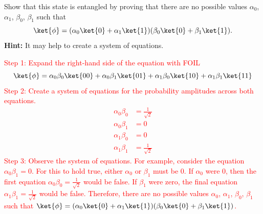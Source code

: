 \documentclass[12pt]{article}
\begin{document}
Show that this state is entangled by proving that there are no possible values $\alpha_0$, $\alpha_1$, $\beta_0$, $\beta_1$ such that
\[
\ket{\phi} = (\alpha_0 \ket{0} + \alpha_1 \ket{1})(\beta_0 \ket{0} + \beta_1 \ket{1}).
\]
\textbf{Hint:} It may help to create a system of equations.

\textcolor{red}{
Step 1: Expand the right-hand side of the equation with FOIL
\[
\ket{\phi} = \alpha_0\beta_0\ket{00} + \alpha_0\beta_1\ket{01} + \alpha_1\beta_0\ket{10} + \alpha_1\beta_1\ket{11}
\]
Step 2: Create a system of equations for the probability amplitudes across both equations.
\begin{align*}
    \alpha_0\beta_0 &= \frac{1}{\sqrt{2}} \\
    \alpha_0\beta_1 &= 0 \\
    \alpha_1\beta_0 &= 0 \\
    \alpha_1\beta_1 &= \frac{1}{\sqrt{2}}
\end{align*}
Step 3: Observe the system of equations. For example, consider the equation $\alpha_0\beta_1 = 0$. For this to hold true, either $\alpha_0$ or $\beta_1$ must be 0. If $\alpha_0$ were 0, then the first equation $\alpha_0\beta_0 = \frac{1}{\sqrt{2}}$ would be false. If $\beta_1$ were zero, the final equation $\alpha_1\beta_1 = \frac{1}{\sqrt{2}}$ would be false. Therefore, there are no possible values $\alpha_0$, $\alpha_1$,
$\beta_0$, $\beta_1$ such that $\ket{\phi} = (\alpha_0 \ket{0} + \alpha_1 \ket{1})(\beta_0 \ket{0} + \beta_1 \ket{1})$.
}
\end{document}
